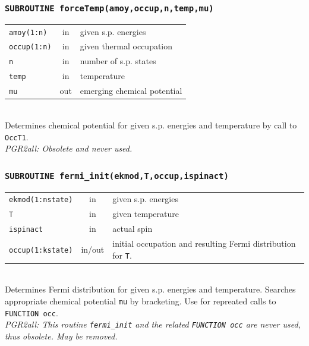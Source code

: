 \documentclass[final,1p]{elsarticle}
\newcommand{\PGRcomm}[1]{{\color{blue}\small\em PGR2all: #1}}
\begin{document}
\subsubsection*{\tt SUBROUTINE forceTemp(amoy,occup,n,temp,mu)}
\begin{tabular}{lcl}
 {\tt amoy(1:n)} & in & given s.p. energies\\
 {\tt occup(1:n)} & in & given thermal occupation\\
 {\tt n} & in & number of s.p. states\\
 {\tt temp} & in & temperature\\
 {\tt mu} & out & emerging chemical potential\\
\end{tabular}
\\[4pt]
Determines chemical potential for given s.p. energies and temperature
by call to {\tt OccT1}.
\\
\PGRcomm{Obsolete and never used.}




\subsubsection*{\tt SUBROUTINE fermi\_init(ekmod,T,occup,ispinact)}
\begin{tabular}{lcl}
 {\tt ekmod(1:nstate)} & in & given s.p. energies\\
 {\tt T} & in & given temperature\\
 {\tt ispinact} & in & actual spin\\
 {\tt occup(1:kstate)} & in/out & initial occupation and resulting
 Fermi distribution for {\tt T}.\\
\end{tabular}
\\[4pt]
Determines Fermi distribution for given s.p. energies and
temperature. Searches appropriate chemical potential {\tt mu} by
bracketing. Use for repreated calls to {\tt FUNCTION occ}.
\\
\PGRcomm{This routine {\tt fermi\_init} and the related
{\tt FUNCTION occ} are never used, thus obsolete. May be removed.}
\end{document}
